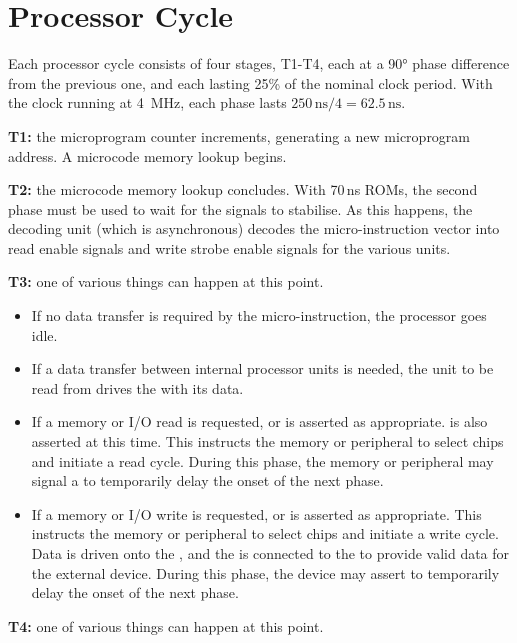 \section{Processor Cycle}

Each processor cycle consists of four stages, T1-T4, each at a 90°
phase difference from the previous one, and each lasting 25\% of the
nominal clock period. With the clock running at 4~MHz, each phase
lasts $250\,\mbox{ns}/4 = 62.5\,\mbox{ns}$.

\begin{description}
\item{\bfseries T1:} the microprogram counter increments, generating a
  new microprogram address. A microcode memory lookup begins.
\item{\bfseries T2:} the microcode memory lookup concludes. With 70\,ns
  ROMs, the second phase must be used to wait for the signals to
  stabilise. As this happens, the decoding unit (which is
  asynchronous) decodes the micro-instruction vector into read enable
  signals and write strobe enable signals for the various units.
\item{\bfseries T3:} one of various things can happen at this point.
  \begin{itemize}
    \item If no data transfer is required by the micro-instruction, the
      processor goes idle.
    \item If a data transfer between internal processor units is
      needed, the unit to be read from drives the \IBUS{} with its data.
    \item If a memory or I/O read is requested,  or  is
      asserted as appropriate.  is also asserted at this
      time. This instructs the memory or peripheral to select chips
      and initiate a read cycle. During this phase, the memory or
      peripheral may signal a  to temporarily delay the onset
      of the next phase.
    \item If a memory or I/O write is requested,  or 
      is asserted as appropriate. This instructs the memory or
      peripheral to select chips and initiate a write cycle. Data is
      driven onto the \IBUS{}, and the \DBUS{} is connected to the
      \IBUS{} to provide valid data for the external device. During
      this phase, the device may assert  to temporarily delay
      the onset of the next phase.
  \end{itemize}
\item{\bfseries T4:} one of various things can happen at this point.

\end{description}

